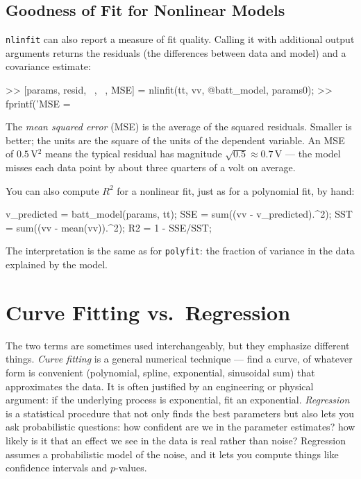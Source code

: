 \documentclass[../../book.tex]{subfiles}
\begin{document}
\subsection{Goodness of Fit for Nonlinear Models}

\lstinline{nlinfit} can also report a measure of fit quality.  Calling it with additional output arguments returns the residuals (the differences between data and model) and a covariance estimate:

\begin{code}
>> [params, resid, ~, ~, MSE] = nlinfit(tt, vv, @batt_model, params0);
>> fprintf('MSE = %
\end{code}

\noindent The \emph{mean squared error} (MSE) is the average of the squared residuals.  Smaller is better; the units are the square of the units of the dependent variable.  An MSE of $0.5$\,V$^2$ means the typical residual has magnitude $\sqrt{0.5} \approx 0.7$\,V --- the model misses each data point by about three quarters of a volt on average.

You can also compute $R^2$ for a nonlinear fit, just as for a polynomial fit, by hand:

\begin{code}
v_predicted = batt_model(params, tt);
SSE = sum((vv - v_predicted).^2);
SST = sum((vv - mean(vv)).^2);
R2 = 1 - SSE/SST;
\end{code}

\noindent The interpretation is the same as for \lstinline{polyfit}: the fraction of variance in the data explained by the model.

\section{Curve Fitting vs.\ Regression}

The two terms are sometimes used interchangeably, but they emphasize different things.  \emph{Curve fitting} is a general numerical technique --- find a curve, of whatever form is convenient (polynomial, spline, exponential, sinusoidal sum) that approximates the data.  It is often justified by an engineering or physical argument: if the underlying process is exponential, fit an exponential.  \emph{Regression} is a statistical procedure that not only finds the best parameters but also lets you ask probabilistic questions: how confident are we in the parameter estimates? how likely is it that an effect we see in the data is real rather than noise?  Regression assumes a probabilistic model of the noise, and it lets you compute things like confidence intervals and $p$-values.
\end{document}
